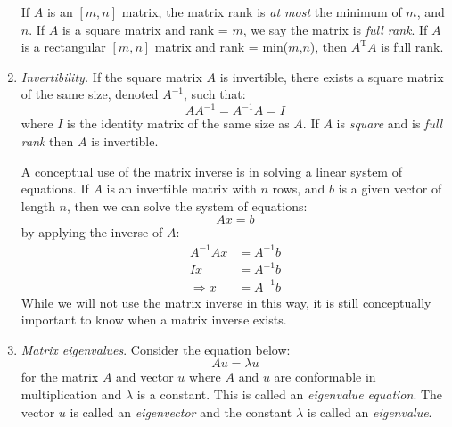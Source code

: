 \begin{enumerate}
\vspace{0.1cm}

\noindent If $A$ is an $[m,n]$ matrix, the matrix rank is \emph{at most} the minimum of $m$, and $n$.  If $A$ is a square matrix and rank = $m$, we say the matrix is \emph{full rank}.  If $A$ is a rectangular $[m,n]$ matrix and rank = min($m$,$n$), then $A^{\text{T}}A$ is full rank.


\item \emph{Invertibility.} If the square matrix $A$ is invertible, there exists a square matrix of the same size, denoted $A^{-1}$, such that:
\begin{equation*}
A A^{-1} = A^{-1}A = I
\end{equation*}
where $I$ is the identity matrix of the same size as $A$.  If $A$ is \emph{square} and is \emph{full rank} then $A$ is invertible.  

A conceptual use of the matrix inverse is in solving a linear system of equations. If $A$ is an invertible matrix with $n$ rows, and $b$ is a given vector of length $n$, then we can solve the system of equations:
\begin{equation*}
Ax = b
\end{equation*}
by applying the inverse of $A$:
\begin{align*}
A^{-1}Ax &= A^{-1}b \\
Ix &= A^{-1}b \\
\Rightarrow x &= A^{-1}b
\end{align*}
While we will not use the matrix inverse in this way, it is still conceptually important to know when a matrix inverse exists.

\item \emph{Matrix eigenvalues}.  Consider the equation below:
\begin{equation*}
Au = \lambda u
\end{equation*}
for the matrix $A$ and vector $u$ where $A$ and $u$ are conformable in multiplication and $\lambda$ is a constant.  This is called an \emph{eigenvalue equation}.  The vector $u$ is called an \emph{eigenvector} and the constant $\lambda$ is called an \emph{eigenvalue}.  


\end{enumerate}
